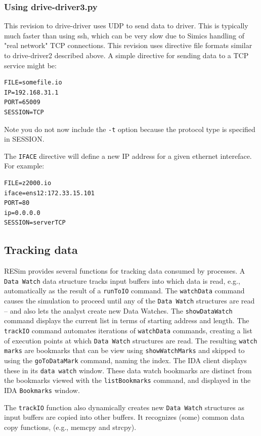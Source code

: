 \documentclass[titlepage]{article}
\begin{document}
\subsubsection{Using drive-driver3.py}
\label{drive-driver3}
This revision to drive-driver uses UDP to send data to driver.  This is typically much faster than using ssh, which can be very slow due to Simics 
handling of "real network" TCP connections.  This revision uses directive file formats similar to drive-driver2 described above.  A simple directive
for sending data to a TCP service might be:
\begin{verbatim}
FILE=somefile.io
IP=192.168.31.1
PORT=65009
SESSION=TCP
\end{verbatim}
Note you do not now include the {\tt -t} option because the protocol type is specified in SESSION.

The {\tt IFACE} directive will define a new IP address for a given ethernet intereface.  For example:
\begin{verbatim}
FILE=z2000.io
iface=ens12:172.33.15.101
PORT=80
ip=0.0.0.0
SESSION=serverTCP
\end{verbatim}

\subsection{Tracking data}
\label{tracking}
RESim provides several functions for tracking data consumed by processes.  A {\tt Data Watch} data structure tracks input buffers into which
data is read, e.g., automatically as the result of a {\tt runToIO} command.  The {\tt watchData} command causes the simulation to proceed until any of the
{\tt Data Watch} structures are read -- and also lets the analyst create new Data Watches. The {\tt showDataWatch} command displays the current list in
terms of starting address and length. 
The {\tt trackIO} command automates iterations of {\tt watchData} commands, creating a list of execution
points at which {\tt Data Watch} structures are read. The resulting {\tt watch marks} are bookmarks that can be view using {\tt showWatchMarks} and
skipped to using the {\tt goToDataMark} command, naming the index.   
The IDA client displays these in its {\tt data watch} window.
These data watch bookmarks are distinct from the bookmarks viewed with the {\tt listBookmarks} command, and displayed in the IDA {\tt Bookmarks} window.

The {\tt trackIO} function also dynamically creates new {\tt Data Watch} structures as input buffers are copied into other buffers.  It recognizes (some) common
data copy functions, (e.g., memcpy and strcpy). 
\end{document}
